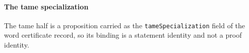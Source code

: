 \paragraph{The tame specialization}
The tame half is a proposition carried as the \texttt{tameSpecialization} field of the word certificate record, so its binding is a statement identity and not a proof identity.
